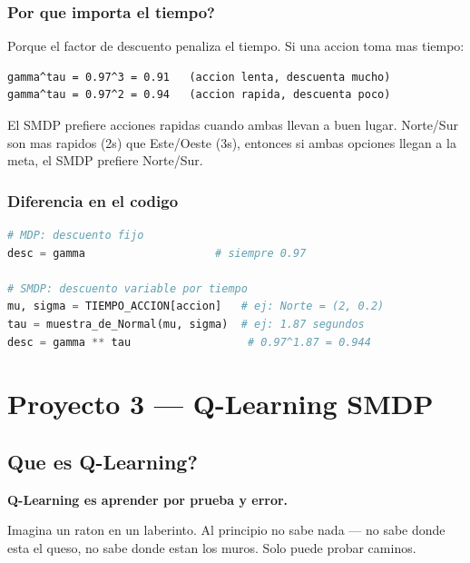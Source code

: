 \documentclass[11pt,a4paper]{article}
\begin{document}
\subsubsection{Por que importa el tiempo?}

Porque el factor de descuento penaliza el tiempo. Si una accion toma mas tiempo:

\begin{lstlisting}
gamma^tau = 0.97^3 = 0.91   (accion lenta, descuenta mucho)
gamma^tau = 0.97^2 = 0.94   (accion rapida, descuenta poco)
\end{lstlisting}

\begin{importante}
El SMDP prefiere acciones rapidas cuando ambas llevan a buen lugar. Norte/Sur son mas rapidos (2s) que Este/Oeste (3s), entonces si ambas opciones llegan a la meta, el SMDP prefiere Norte/Sur.
\end{importante}

\subsubsection{Diferencia en el codigo}

\begin{lstlisting}[language=Python]
# MDP: descuento fijo
desc = gamma                    # siempre 0.97

# SMDP: descuento variable por tiempo
mu, sigma = TIEMPO_ACCION[accion]   # ej: Norte = (2, 0.2)
tau = muestra_de_Normal(mu, sigma)  # ej: 1.87 segundos
desc = gamma ** tau                  # 0.97^1.87 = 0.944
\end{lstlisting}

\newpage

\section{Proyecto 3 — Q-Learning SMDP}

\subsection{Que es Q-Learning?}

\textbf{Q-Learning es aprender por prueba y error.}

Imagina un raton en un laberinto. Al principio no sabe nada — no sabe donde esta el queso, no sabe donde estan los muros. Solo puede probar caminos.
\end{document}
